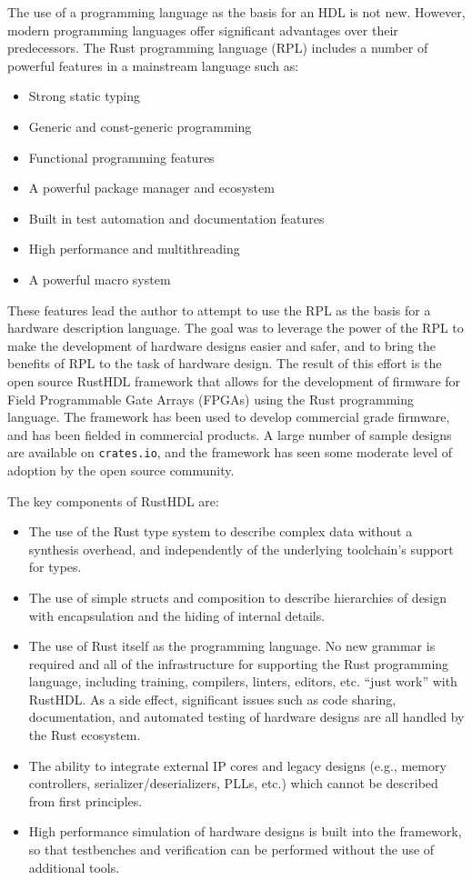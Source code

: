 \documentclass[conference]{IEEEtran}
\begin{document}
The use of a programming language as the basis for an HDL is not new.  However, modern programming
languages offer significant advantages over their predecessors.  The Rust programming language (RPL)
includes a number of powerful features in a mainstream language such as:
\begin{itemize}
  \item Strong static typing
  \item Generic and const-generic programming
  \item Functional programming features
  \item A powerful package manager and ecosystem
  \item Built in test automation and documentation features
  \item High performance and multithreading
  \item A powerful macro system
\end{itemize}
These features lead the author to attempt to use the RPL as the basis for
a hardware description language.  The goal was to leverage the power of the RPL
to make the development of hardware designs easier and safer, and to bring the benefits of RPL
to the task of hardware design.  The result of this effort is the open source RustHDL 
framework that allows for the development of firmware for Field Programmable Gate Arrays (FPGAs)
using the Rust programming language.  The framework has been used to develop commercial grade
firmware, and has been fielded in commercial products.  A large number of sample designs are
available on \verb|crates.io|, and the framework has seen some moderate level of adoption by the open source
community.

The key components of RustHDL are:
\begin{itemize}
\item The use of the Rust type system to describe complex data without
  a synthesis overhead, and independently of the underlying toolchain's support for
  types.
\item The use of simple structs and composition to describe hierarchies of design
  with encapsulation and the hiding of internal details.
\item The use of Rust itself as the programming language.  No new grammar is required
  and all of the infrastructure for supporting the Rust programming language, including training,
  compilers, linters, editors, etc. ``just work'' with RustHDL.  As a side effect,
  significant issues such as code sharing, documentation, and automated testing of hardware designs 
  are all handled by the Rust ecosystem.
\item The ability to integrate external IP cores and legacy designs (e.g., memory controllers,
  serializer/deserializers, PLLs, etc.) which cannot be described from first principles.
\item High performance simulation of hardware designs is built into the framework, so that
  testbenches and verification can be performed without the use of additional tools.
\end{itemize}
\end{document}
